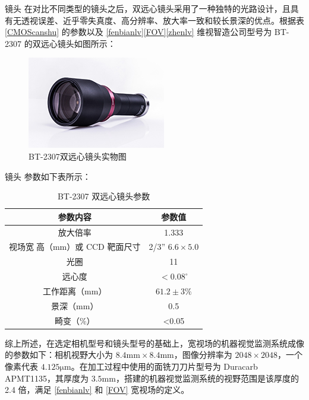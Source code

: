 \documentclass[aspectratio=169,t,xcolor=table,10pt]{ctexbeamer}
\numberwithin{equation}{section} %
\begin{document}
	\begin{frame}[squeeze]
		\begin{block}{镜头}
			\qquad 在对比不同类型的镜头之后，双远心镜头采用了一种独特的光路设计，且具有无透视误差、近乎零失真度、高分辨率、放大率一致和较长景深的优点。根据表 \ref{CMOScanshu} 的参数以及 \eqref{fenbianlv}\eqref{FOV}\eqref{zhenlv} 维视智造公司型号为 BT-2307 的双远心镜头如图所示：
			\begin{figure}[H]
				\centering
				\includegraphics[width=0.5\linewidth]{Figure/BT}
				\caption{BT-2307双远心镜头实物图 }
			\end{figure}
		\end{block}
	\end{frame}

	\begin{frame}[squeeze]
		\begin{block}{镜头}
			\qquad 参数如下表所示：
			\begin{table}[H]
				\centering
				\caption{BT-2307 双远心镜头参数}
				\begin{tabular}{c|c}
					\toprule[1.5pt]
					参数内容 & 参数值 \\
					\midrule[0.75pt]
					放大倍率  & 1.333 \\
					视场宽高（mm）或 CCD 靶面尺寸 & 2/3'' $6.6\times5.0$ \\
					光圈 & 11  \\
					远心度 & $<0.08^{\circ}$  \\
					工作距离（mm） & $61.2\pm3\%$  \\
					景深（mm） & 0.5 \\ 
					畸变（\%） &  <0.05  \\
					\bottomrule[1.5pt]
				\end{tabular}
				\label{BTcanshu}
			\end{table}
			\qquad 综上所述，在选定相机型号和镜头型号的基础上，宽视场的机器视觉监测系统成像的参数如下：相机视野大小为 $8.4\mathrm{mm}\times8.4\mathrm{mm}$，图像分辨率为 $2048\times2048$，一个像素代表 $4.125\mathrm{\mu m}$。在加工过程中使用的面铣刀刀片型号为 Duracarb APMT1135，其厚度为 $3.5\mathrm{mm}$，搭建的机器视觉监测系统的视野范围是该厚度的 2.4 倍，满足 \eqref{fenbianlv} 和 \eqref{FOV} 宽视场的定义。
		\end{block}
	\end{frame}
\end{document}
